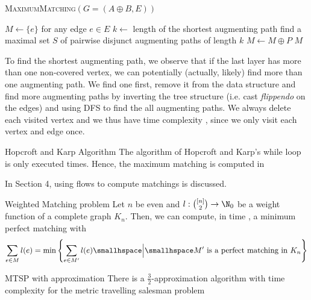 \begin{algorithm}
    \caption{\textsc{MaximumMatching}$(G = (A \oplus B, E))$}
    \begin{algorithmic}[1]
        \State $M \gets \{e\}$ for any edge $e \in E$ 
            \State $k \gets$ length of the shortest augmenting path
            \State find a maximal set $S$ of pairwise disjunct augmenting paths of length $k$
                \State $M \gets M \oplus P$ 
            \EndFor
        \EndWhile
        \State \Return $M$
    \end{algorithmic}
\end{algorithm}
To find the shortest augmenting path, we observe that if the last layer has more than one non-covered vertex, we can potentially (actually, likely) find more than one augmenting path.
We find one first, remove it from the data structure and find more augmenting paths by inverting the tree structure (i.e. cast \textit{flippendo} on the edges) and using DFS to find the all augmenting paths.
We always delete each visited vertex and we thus have time complexity , since we only visit each vertex and edge once.

\begin{theorem}[]{Hopcroft and Karp Algorithm}
    The algorithm of Hopcroft and Karp's while loop is only executed  times.
    Hence, the maximum matching is computed in 
\end{theorem}

\newpage
{}

In Section 4, using flows to compute matchings is discussed.

\begin{theorem}[]{Weighted Matching problem}
    Let $n$ be even and $l: {[n] \choose 2} \rightarrow \N_0$ be a weight function of a complete graph $K_n$. Then, we can compute, in time , a minimum perfect matching with
    \begin{align*}
        \sum_{e \in M} l(e) = \min\left\{ \sum_{e \in M'} l(e) \smallhspace \Big| \smallhspace M' \text{ is a perfect matching in } K_n \right\}
    \end{align*}
\end{theorem}

\begin{theorem}[]{MTSP with approximation}
    There is a $\frac{3}{2}$-approximation algorithm with time complexity  for the metric travelling salesman problem
\end{theorem}

